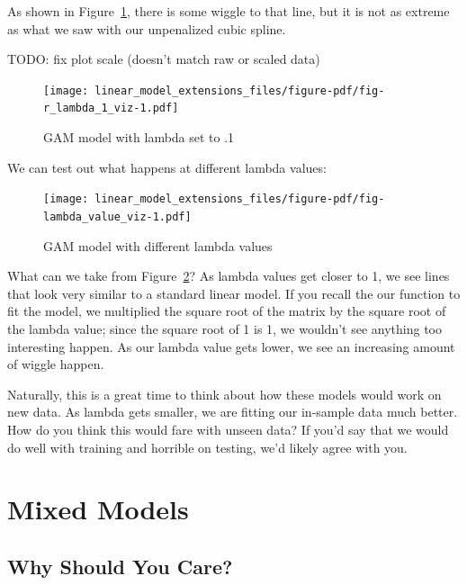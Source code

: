 \documentclass[
  letterpaper,
]{krantz}
\begin{document}
As shown in Figure~\ref{fig-r_lambda_1_viz}, there is some wiggle to
that line, but it is not as extreme as what we saw with our unpenalized
cubic spline.

TODO: fix plot scale (doesn't match raw or scaled data)

\begin{figure}

{\centering \texttt{[image: linear\_model\_extensions\_files/figure-pdf/fig-r\_lambda\_1\_viz-1.pdf]}

}

\caption{\label{fig-r_lambda_1_viz}GAM model with lambda set to .1}

\end{figure}

We can test out what happens at different lambda values:

\begin{figure}

{\centering \texttt{[image: linear\_model\_extensions\_files/figure-pdf/fig-lambda\_value\_viz-1.pdf]}

}

\caption{\label{fig-lambda_value_viz}GAM model with different lambda
values}

\end{figure}

What can we take from Figure~\ref{fig-lambda_value_viz}? As lambda
values get closer to 1, we see lines that look very similar to a
standard linear model. If you recall the our function to fit the model,
we multiplied the square root of the matrix by the square root of the
lambda value; since the square root of 1 is 1, we wouldn't see anything
too interesting happen. As our lambda value gets lower, we see an
increasing amount of wiggle happen.

Naturally, this is a great time to think about how these models would
work on new data. As lambda gets smaller, we are fitting our in-sample
data much better. How do you think this would fare with unseen data? If
you'd say that we would do well with training and horrible on testing,
we'd likely agree with you.

\section{Mixed Models}\label{sec-mixed-models}

\subsection{Why Should You Care?}\label{sec-mixed-models-why}
\end{document}
